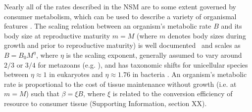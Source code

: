 \documentclass{pnastwo}
\begin{document}
\begin{article}
Nearly all of the rates described in the NSM are to some extent governed by
consumer metabolism, which can be used to describe a variety of organismal
features \cite{Brown:2004wq}.  The scaling relation between an organism's
metabolic rate $B$ and its body size at reproductive maturity $m=M$ (where $m$ denotes body sizes during growth and prior to reproductive maturity) is well
documented~\cite{West:2002it} and scales as $B = B_0 M^\eta$, where $\eta$ is
the scaling exponent, generally assumed to vary around $2/3$ or $3/4$ for
metazoans (e.g. \cite{Brown:2004wq}), and has taxonomic shifts for unicellular species
between $\eta\approx 1$ in eukaryotes and $\eta\approx 1.76$ in bacteria
\cite{DeLong:2010dy,Kempes:2012hy}. 
An organism's metabolic rate is proportional to the cost of tissue maintenance without growth (i.e. at $m=M$) such that $\beta = \xi B$, where $\xi$ is related to the conversion efficiency of resource to consumer tissue (Supporting Information, section XX).


\end{article}
\end{document}
